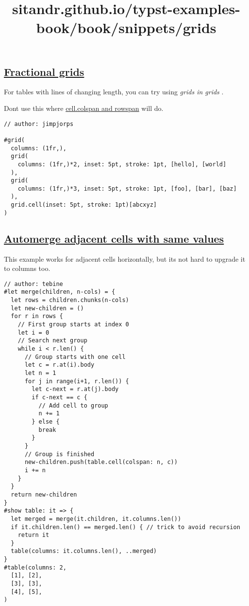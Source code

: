 \title{sitandr.github.io/typst-examples-book/book/snippets/grids}

\subsection{\texorpdfstring{\hyperref[fractional-grids]{Fractional
grids}}{Fractional grids}}\label{fractional-grids}

For tables with lines of changing length, you can try using \emph{grids
in grids} .

Don\textquotesingle t use this where
\href{https://typst.app/docs/reference/model/table/\#definitions-cell-colspan}{cell.colspan
and rowspan} will do.

\begin{verbatim}
// author: jimpjorps

#grid(
  columns: (1fr,),
  grid(
    columns: (1fr,)*2, inset: 5pt, stroke: 1pt, [hello], [world]
  ),
  grid(
    columns: (1fr,)*3, inset: 5pt, stroke: 1pt, [foo], [bar], [baz]
  ),
  grid.cell(inset: 5pt, stroke: 1pt)[abcxyz]
)
\end{verbatim}

\pandocbounded{}

\subsection{\texorpdfstring{\hyperref[automerge-adjacent-cells-with-same-values]{Automerge
adjacent cells with same
values}}{Automerge adjacent cells with same values}}\label{automerge-adjacent-cells-with-same-values}

This example works for adjacent cells horizontally, but
it\textquotesingle s not hard to upgrade it to columns too.

\begin{verbatim}
// author: tebine
#let merge(children, n-cols) = {
  let rows = children.chunks(n-cols)
  let new-children = ()
  for r in rows {
    // First group starts at index 0
    let i = 0 
    // Search next group
    while i < r.len() {
      // Group starts with one cell
      let c = r.at(i).body
      let n = 1
      for j in range(i+1, r.len()) {
        let c-next = r.at(j).body
        if c-next == c {
          // Add cell to group
          n += 1
        } else {
          break
        }
      }
      // Group is finished
      new-children.push(table.cell(colspan: n, c))
      i += n
    }
  }
  return new-children
}
#show table: it => {
  let merged = merge(it.children, it.columns.len())
  if it.children.len() == merged.len() { // trick to avoid recursion
    return it
  }
  table(columns: it.columns.len(), ..merged)
}
#table(columns: 2,
  [1], [2],
  [3], [3],
  [4], [5],
)
\end{verbatim}

